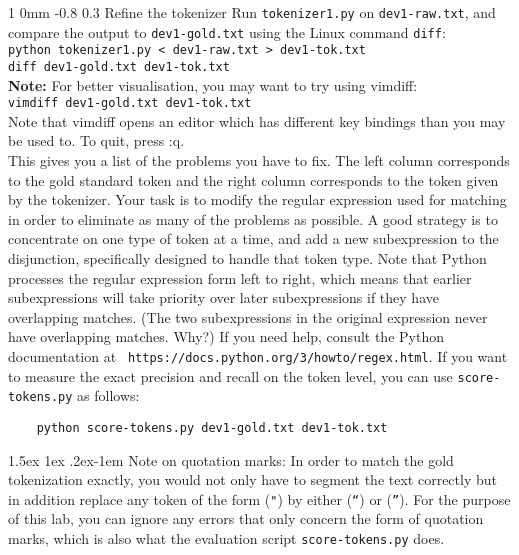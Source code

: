 \documentclass[11pt]{article}
\makeatletter
\newcommand{\newsec}[2]{\section{#1}\label{sec:#2}\noindent}
\renewcommand{\section}{\@startsection
{section}%
{1}%
{0mm}%
{-0.8\baselineskip}%
{0.3\baselineskip}%
{\bfseries\large}}%
\renewcommand{\paragraph}{%
  \@startsection{paragraph}{4}%
  {\z@}{1.5ex \@plus 1ex \@minus .2ex}{-1em}%
  {\normalfont\normalsize\bfseries}%
}\makeatother
\makeatother
\begin{document}
\newsec{Refine the tokenizer }{refine}%
Run {\tt tokenizer1.py} on {\tt dev1-raw.txt}, and compare the output
to {\tt dev1-gold.txt} using the Linux command {\tt diff}: \\

\noindent
{\tt python tokenizer1.py < dev1-raw.txt > dev1-tok.txt}\\

\noindent
{\tt diff dev1-gold.txt dev1-tok.txt}\\

\textbf{Note:} For better visualisation, you may want to try using vimdiff:\\
{\tt vimdiff dev1-gold.txt dev1-tok.txt}\\
Note that vimdiff opens an editor which has different key bindings than
you may be used to. To quit, press :q.\\

\noindent
This gives you a list of the problems you have to fix.  The left column
corresponds to the gold standard token and the right column corresponds to the
token given by the tokenizer. Your task is to modify the regular expression
used for matching in order to eliminate as many of the problems as possible. A
good strategy is to concentrate on one type of token at a time, and add a new
subexpression to the disjunction, specifically designed to handle that token
type. Note that Python processes the regular expression form left to right,
which means that earlier subexpressions will take priority over later
subexpressions if they have overlapping matches. (The two subexpressions in the
original expression never have overlapping matches. Why?) If you need help,
consult the Python documentation at {\tt
https://docs.python.org/3/howto/regex.html}. If you want to measure the exact
precision and recall on the token level, you can use {\tt score-tokens.py} as
follows:
\begin{verbatim}
    python score-tokens.py dev1-gold.txt dev1-tok.txt
\end{verbatim}


\paragraph{Note on quotation marks:} In order to match the gold
tokenization exactly, you would not only have to segment the text
correctly but in addition replace any token of the form ({\tt "}) by
either ({\tt ``}) or ({\tt ''}). For the purpose of this lab,
you can ignore any errors that only concern the form of quotation
marks, which is also what the evaluation script {\tt score-tokens.py}
does.
\end{document}
